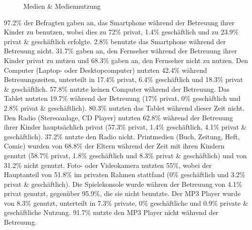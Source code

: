 \begin{figure}[hbt]
\caption{Medien \& Mediennutzung}\label{fig:Mediennutzung}
\centering
{}
\end{figure}

97.2\% der Befragten gaben an, das Smartphone während der Betreuung ihrer Kinder zu benutzen, wobei dies zu 72\% privat, 1.4\% geschäftlich und zu 23.9\% privat \& geschäftlich erfolgte. 2.8\% benutzte das Smartphone während der Betreuung nicht. 31.7\% gaben an, den Fernseher während der Betreuung ihrer Kinder privat zu nutzen und 68.3\% gaben an, den Fernseher nicht zu nutzen. Den Computer (Laptop- oder Desktopcomputer) nutzten 42.4\% während Betreuungszeiten, unterteilt in 17.4\% privat, 6.4\% geschäftlich und 18.3\% privat \& geschäftlich. 57.8\% nutzte keinen Computer während der Betreuung. Das Tablet nutzten 19.7\% während der Betreuung (17\% privat, 0\% geschäftlich und 2.8\% privat \& geschäftlich). 80.3\% nutzten das Tablet während dieser Zeit nicht. Den Radio (Stereoanlage, CD Player) nutzten 62.8\% während der Betreuung ihrer Kinder hauptsächlich privat (57.3\% privat, 1.4\% geschäftlich, 4.1\% privat \& geschäftlich). 37.2\% nutzte den Radio nicht. Printmedien (Buch, Zeitung, Heft, Comic) wurden von 68.8\% der Eltern während der Zeit mit ihren Kindern genutzt (58.7\% privat, 1.8\% geschäftlich und 8.3\% privat \& geschäftlich) und von 31.2\% nicht genutzt. Foto- oder Videokamera nutzten 55\%, wobei der Hauptanteil von 51.8\% im privaten Rahmen stattfand (0\% geschäftlich und 3.2\% privat \& geschäftlich). Die Spielekonsole wurde währen der Betreuung von 4.1\% privat genutzt, gegenüber 95.9\%, die sie nicht benutzte. Der MP3 Player wurde von 8.3\% genutzt, unterteilt in 7.3\% private, 0\% geschäftliche und 0.9\% private \& geschäftliche Nutzung. 91.7\% nutzte den MP3 Player nicht während der Betreuung.

